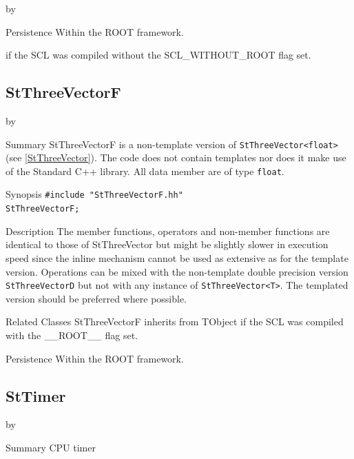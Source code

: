 \documentclass[twoside]{article}
\newcommand{\name}[1]{\textsf{#1}}%
\newcommand{\entrylabel}[1]{\mbox{\textbf{{#1}}}\hfil}%
\newenvironment{entry}
{\begin{list}{}%
    {\renewcommand{\makelabel}{\entrylabel}%
     \setlength{\labelwidth}{90pt}%
     \setlength{\leftmargin}{\labelwidth}
     \advance\leftmargin by \labelsep%
      }%
    }%
  {\end{list}}
\newcommand{\Entrylabel}[1]%
{\raisebox{0pt}[1ex][0pt]{\makebox[\labelwidth][l]%
    {\parbox[t]{\labelwidth}{\hspace{0pt}\textbf{{#1}}}}}}
\newenvironment{Entry}%
{\renewcommand{\entrylabel}{\Entrylabel}\begin{entry}}%
  {\end{entry}}
\begin{document}
\begin{description}
\begin{Entry}
\item[Persistence]
    Within the ROOT framework.

    if the SCL was compiled without the \name{SCL\_WITHOUT\_ROOT} flag set.

%
%
\subsection{StThreeVectorF }
\begin{Entry}
\item[Summary]
    StThreeVectorF is a non-template version of \verb+StThreeVector<float>+
    (see \ref{StThreeVector}). The code does not contain templates nor
    does it make use of the Standard C++ library. All data member are of
    type \texttt{float}.
    
\item[Synopsis]
    \verb+#include "StThreeVectorF.hh"+ \\
    \verb+StThreeVectorF;+
    
\item[Description]       
    The member functions, operators and non-member functions are identical
    to those of StThreeVector but might be slightly slower in execution speed
    since the inline mechanism cannot be used as extensive as for the template
    version. Operations can be mixed with the non-template double precision version
    \texttt{StThreeVectorD} but not with any instance of \verb+StThreeVector<T>+.
    The templated version should be preferred where possible.

\item[Related Classes]
    StThreeVectorF inherits from TObject 
    if the SCL was compiled with the \name{\_\_ROOT\_\_} flag set.

\item[Persistence]
    Within the ROOT framework.

\end{Entry}

\clearpage

%
%
\subsection{StTimer }
\begin{Entry}
\item[Summary]
    CPU timer
    

\end{Entry}
\end{Entry}
\end{description}
\end{document}
